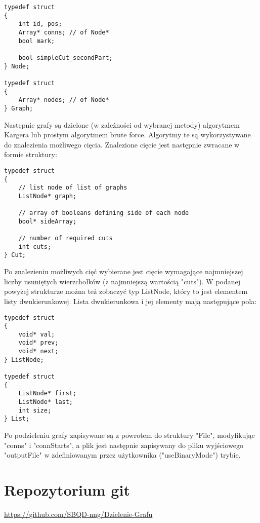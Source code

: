 \documentclass{article}
\begin{document}
\begin{verbatim}
typedef struct
{
    int id, pos;
    Array* conns; // of Node*
    bool mark;

    bool simpleCut_secondPart;
} Node;

typedef struct
{
    Array* nodes; // of Node*
} Graph;
\end{verbatim}
Następnie grafy są dzielone (w zależności od wybranej metody) algorytmem Kargera lub prostym algorytmem brute force. Algorytmy te są wykorzystywane do znalezienia możliwego cięcia. Znalezione cięcie jest następnie zwracane w formie struktury:
\begin{verbatim}
typedef struct
{
    // list node of list of graphs
    ListNode* graph;

    // array of booleans defining side of each node
    bool* sideArray;

    // number of required cuts
    int cuts;
} Cut;    
\end{verbatim}
Po znalezieniu możliwych cięć wybierane jest cięcie wymagające najmniejszej liczby usuniętych wierzchołków (z najmniejszą wartością "cuts"). W podanej powyżej strukturze można też zobaczyć typ ListNode, który to jest elementem listy dwukierunkowej. Lista dwukierunkowa i jej elementy mają następujące pola:
\begin{verbatim}
typedef struct
{
    void* val;
    void* prev;
    void* next;
} ListNode;

typedef struct
{
    ListNode* first;
    ListNode* last;
    int size;
} List;
\end{verbatim}
Po podzieleniu grafy zapisywane są z powrotem do struktury "File", modyfikując "conns" i "connStarts", a plik jest następnie zapisywany do pliku wyjściowego "outputFile" w zdefiniowanym przez użytkownika ("useBinaryMode") trybie.
\section{Repozytorium git}
\url{https://github.com/SBQD-nng/Dzielenie-Grafu}
\end{document}
